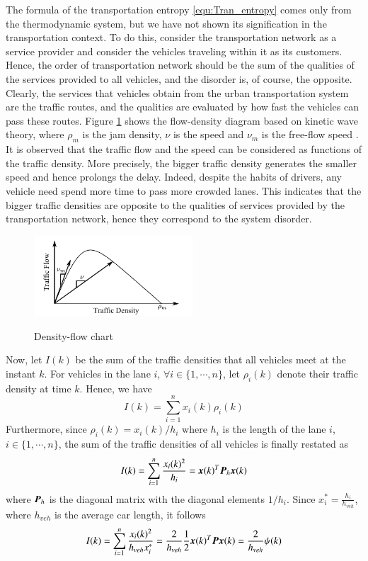 \documentclass[preprint,authoryear,12pt]{elsarticle}
\renewcommand{\vec}[1]{\mbox{\boldmath$#1$}}
\newcommand{\mat}[1]{\mbox{\boldmath$#1$}}
\begin{document}
The formula of the transportation entropy \eqref{equ:Tran_entropy}
comes only from the thermodynamic system, but we have not shown its
signification in the transportation context. To do this, consider the
transportation network as a service provider and consider the
vehicles traveling within it as its customers. Hence, the order of
transportation network should be the sum of the qualities of the
services provided to all vehicles, and the disorder is, of course,
the opposite. Clearly, the services that vehicles obtain from the
urban transportation system are the traffic routes, and the qualities
are evaluated by how fast the vehicles can pass these routes. Figure
\ref{fig:d_q} shows the flow-density diagram based on kinetic wave
theory, where $\rho_m$ is the jam density, $\nu$ is the speed and
$\nu_m$ is the free-flow speed \citep{ukkusuri_robust_2010}. It is
observed that the traffic flow and the speed can be considered as
functions of the traffic density. More precisely, the bigger traffic
density generates the smaller speed and hence prolongs the delay.
Indeed, despite the habits of drivers, any vehicle need spend more
time to pass more crowded lanes. This indicates that the bigger
traffic densities are opposite to the qualities of services provided
by the transportation network, hence they correspond to the system
disorder.

\begin{figure}[ht]
  \centering
  \includegraphics[height=3cm]{pics/d-q}\\
  \caption{Density-flow chart}
  \label{fig:d_q}
\end{figure}

Now, let $I(k)$ be the sum of the traffic densities that all vehicles
meet at the instant $k$. For vehicles in the lane $i$, $\forall i\in
\{1,\cdots,n\}$, let $\rho_i(k)$ denote their traffic density at time
$k$. Hence, we have
$$I(k)=\sum_{i=1}^{n} x_i(k)\rho_i(k)$$
Furthermore, since $\rho_i(k)=x_i(k)/h_i$ where $h_i$ is the length
of the lane $i$, $i\in \{1,\cdots,n\}$, the sum of the traffic
densities of all vehicles is finally restated as
\begin{equation}
\label{equ:quality_service}
I(k)=\sum_{i=1}^{n}
\frac{x_i(k)^2}{h_i}=\vec{x}(k)^T\mat{P}_h\vec{x}(k)
\end{equation}
where $\mat{P}_h$ is the diagonal matrix with the diagonal elements
$1/h_i$. Since $x_i^*=\frac{h_i}{h_{veh}}$, where $h_{veh}$ is the
average car length, it follows
\begin{equation}
I(k) = \sum_{i=1}^{n}\frac{x_i(k)^2}{h_{veh} x_i^*}
= \frac{2}{h_{veh}} \frac{1}{2}\vec{x}(k)^T\mat{P}\vec{x}(k)
= \frac{2}{h_{veh}} \psi(k)
\end{equation}
\end{document}
